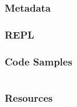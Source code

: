 \documentclass{beamer}
\begin{document}
\begin{frame}
  \frametitle{Metadata}

\end{frame}

\begin{frame}
  \frametitle{REPL}
%
\end{frame}


\begin{frame}
  \frametitle{Code Samples} 
  \inputminted{clojure}{src/xml-parse.clj}
\end{frame}  

\begin{frame}
  \frametitle{Resources}
\end{frame}

% 
%
\end{document}

